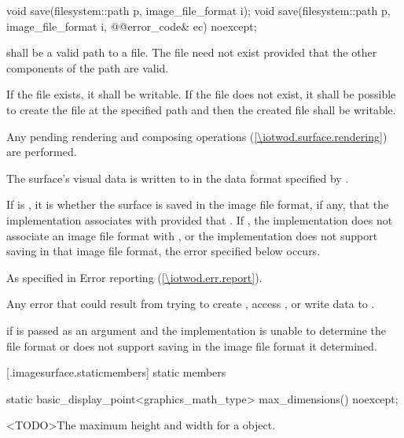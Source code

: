 %
\begin{itemdecl}
void save(filesystem::path p, image_file_format i);
void save(filesystem::path p, image_file_format i, @\stdqualifier{}@error_code& ec) noexcept;
\end{itemdecl}
\begin{itemdescr}
\pnum
\requires
{} shall be a valid path to a file. The file need not exist provided that the other components of the path are valid.

\pnum
If the file exists, it shall be writable. If the file does not exist, it shall be possible to create the file at the specified path and then the created file shall be writable.

\pnum
\effects
Any pending rendering and composing operations (\ref{\iotwod.surface.rendering}) are performed.

\pnum
The surface's visual data is written to  in the data format specified by .

\pnum
If  is , it is  whether the surface is saved in the image file format, if any, that the implementation associates with  provided that . If , the implementation does not associate an image file format with , or the implementation does not support saving in that image file format, the error specified below occurs.

\pnum
\throws
As specified in Error reporting (\ref{\iotwod.err.report}).

\pnum
\errors
Any error that could result from trying to create , access , or write data to .

\pnum
{} if  is passed as an argument and the implementation is unable to determine the file format or does not support saving in the image file format it determined.
\end{itemdescr}

 [\iotwod.imagesurface.staticmembers] { static members}

%
\begin{itemdecl}
static basic_display_point<graphics_math_type> max_dimensions() noexcept;
\end{itemdecl}
\begin{itemdescr}
\pnum
\returns
<TODO>The maximum height and width for a  object.
\end{itemdescr}

